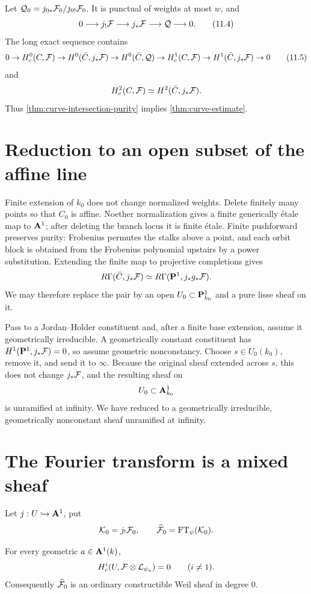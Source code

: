 Let
\(\mathcal Q_0=j_{0*}\mathcal F_0/j_{0!}\mathcal F_0\).  It is punctual of weights at most
\(w\), and
\[
 0\longrightarrow j_!\mathcal F\longrightarrow j_*\mathcal F
 \longrightarrow\mathcal Q\longrightarrow0.
\tag{11.4}\label{eq:jshriek-jstar}
\]
The long exact sequence contains
\[
 0\to H_c^0(C,\mathcal F)\to H^0(\bar C,j_*\mathcal F)
 \to H^0(\bar C,\mathcal Q)\to H_c^1(C,\mathcal F)
 \to H^1(\bar C,j_*\mathcal F)\to0
\tag{11.5}\label{eq:boundary-long-exact}
\]
and
\[
 H_c^2(C,\mathcal F)\simeq H^2(\bar C,j_*\mathcal F).
\]
Thus \cref{thm:curve-intersection-purity} implies
\cref{thm:curve-estimate}.

\section{Reduction to an open subset of the affine line}

Finite extension of \(k_0\) does not change normalized weights.  Delete
finitely many points so that \(C_0\) is affine.  Noether normalization
gives a finite generically \'etale map to \(\mathbf A^1\); after deleting the
branch locus it is finite \'etale.  Finite pushforward preserves purity:
Frobenius permutes the stalks above a point, and each orbit block is
obtained from the Frobenius polynomial upstairs by a power substitution.
Extending the finite map to projective completions gives
\[
 R\Gamma(\bar C,j_*\mathcal F)
 \simeq R\Gamma(\mathbf P^1,j_*g_*\mathcal F).
\]
We may therefore replace the pair by an open
\(U_0\subset\mathbf P^1_{k_0}\) and a pure lisse sheaf on it.

Pass to a Jordan--Holder constituent and, after a finite base extension,
assume it geometrically irreducible.  A geometrically constant
constituent has \(H^1(\mathbf P^1,j_*\mathcal F)=0\), so assume geometric
nonconstancy.  Choose \(s\in U_0(k_0)\), remove it, and send it to
\(\infty\).  Because the original sheaf extended across \(s\), this does
not change \(j_*\mathcal F\), and the resulting sheaf on
\[
 U_0\subset\mathbf A^1_{k_0}
\]
is unramified at infinity.  We have reduced to a geometrically
irreducible, geometrically nonconstant sheaf unramified at infinity.

\section{The Fourier transform is a mixed sheaf}

Let \(j:U\hookrightarrow\mathbf A^1\), put
\[
 \mathcal K_0=j_!\mathcal F_0,\qquad
 \widehat{\mathcal F}_0=\operatorname{FT}_\psi(\mathcal K_0).
\]

\begin{lemma}
\label{lem:twisted-cohom-concentration}
For every geometric \(a\in\mathbf A^1(k)\),
\[
 H_c^i(U,\mathcal F\otimes\mathcal L_{\psi_a})=0\qquad(i\ne1).
\]
Consequently \(\widehat{\mathcal F}_0\) is an ordinary constructible Weil
sheaf in degree \(0\).
\end{lemma}

